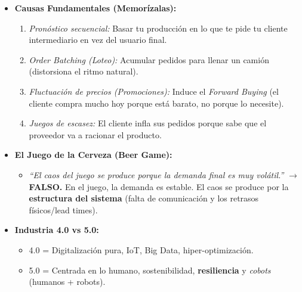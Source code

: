 \begin{itemize}[itemsep=1ex]
    \item \textbf{Causas Fundamentales (Memorízalas):}
    \begin{enumerate}
        \item \textit{Pronóstico secuencial:} Basar tu producción en lo que te pide tu cliente intermediario en vez del usuario final.
        \item \textit{Order Batching (Loteo):} Acumular pedidos para llenar un camión (distorsiona el ritmo natural).
        \item \textit{Fluctuación de precios (Promociones):} Induce el \textit{Forward Buying} (el cliente compra mucho hoy porque está barato, no porque lo necesite).
        \item \textit{Juegos de escasez:} El cliente infla sus pedidos porque sabe que el proveedor va a racionar el producto.
    \end{enumerate}
    
    \item \textbf{El Juego de la Cerveza (Beer Game):}
    \begin{itemize}
        \item \textit{``El caos del juego se produce porque la demanda final es muy volátil.''} $\rightarrow$ \textbf{FALSO.} En el juego, la demanda es estable. El caos se produce por la \textbf{estructura del sistema} (falta de comunicación y los retrasos físicos/lead times).
    \end{itemize}
    
    \item \textbf{Industria 4.0 vs 5.0:}
    \begin{itemize}
        \item 4.0 = Digitalización pura, IoT, Big Data, hiper-optimización.
        \item 5.0 = Centrada en lo humano, sostenibilidad, \textbf{resiliencia} y \textit{cobots} (humanos + robots).
    \end{itemize}
\end{itemize}
